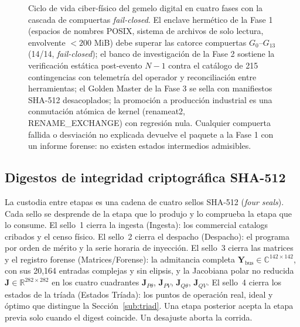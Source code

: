 \begin{figure}[!t]
\centering
\resizebox{0.88\textwidth}{!}{}
\caption{Ciclo de vida ciber-físico del gemelo digital en cuatro fases con la cascada de compuertas \emph{fail-closed}. El enclave hermético de la Fase 1 (espacios de nombres POSIX, sistema de archivos de solo lectura, envolvente ${<}200$ MiB) debe superar las catorce compuertas $G_0$--$G_{13}$ (14/14, \emph{fail-closed}); el banco de investigación de la Fase 2 sostiene la verificación estática post-evento $N-1$ contra el catálogo de 215 contingencias con telemetría del operador y reconciliación entre herramientas; el Golden Master de la Fase 3 se sella con manifiestos SHA-512 desacoplados; la promoción a producción industrial es una conmutación atómica de kernel (renameat2, RENAME\_EXCHANGE) con regresión nula. Cualquier compuerta fallida o desviación no explicada devuelve el paquete a la Fase 1 con un informe forense: no existen estados intermedios admisibles.}
\label{fig:gemelo_fases}
\end{figure}


\subsection{Digestos de integridad criptográfica SHA-512}
\label{sub:seals}

La custodia entre etapas es una cadena de cuatro sellos SHA-512 (\emph{four seals}). Cada sello se desprende de la etapa que lo produjo y lo comprueba la etapa que lo consume. El sello~1 cierra la ingesta (Ingesta): los commercial catalogs cribados y el censo físico. El sello~2 cierra el despacho (Despacho): el programa por orden de mérito y la serie horaria de inyección. El sello~3 cierra las matrices y el registro forense (Matrices/Forense): la admitancia completa $\mathbf{Y}_{\mathrm{bus}}\in\mathbb{C}^{142\times 142}$, con sus 20,164 entradas complejas y sin elipsis, y la Jacobiana polar no reducida $\mathbf{J}\in\mathbb{R}^{282\times 282}$ en los cuatro cuadrantes $\mathbf{J}_{P\theta}$, $\mathbf{J}_{PV}$, $\mathbf{J}_{Q\theta}$, $\mathbf{J}_{QV}$. El sello~4 cierra los estados de la tríada (Estados Tríada): los puntos de operación real, ideal y óptimo que distingue la Sección~\ref{sub:triad}. Una etapa posterior acepta la etapa previa solo cuando el digest coincide. Un desajuste aborta la corrida.


